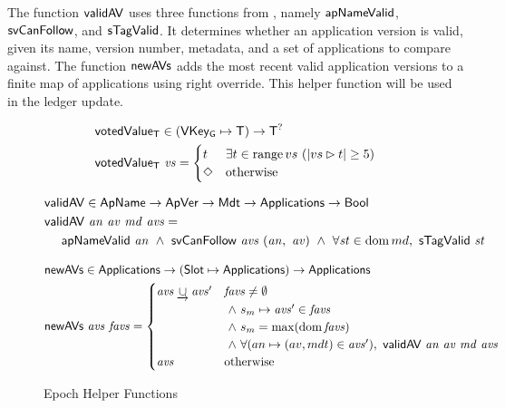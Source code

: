 The function $\mathsf{validAV}$ uses three functions from \cite{byron_ledger_spec}, namely
$\mathsf{apNameValid}$, $\mathsf{svCanFollow}$, and $\mathsf{sTagValid}$. It determines
whether an application version is valid, given its name, version number,
metadata, and a set of applications to compare against.
The function $\mathsf{newAVs}$ adds the most recent valid application
versions to a finite map of applications using right override.
This helper function will be used in the ledger update.

\begin{figure}[htb]
  \begin{align*}
      & \mathsf{votedValue_T} \in (\mathsf{VKey_G}\mapsto\mathsf{T}) \to \mathsf{T}^?\\
      & \mathsf{votedValue_T}~\mathit{vs} =
        \begin{cases}
          t & \exists t\in\operatorname{range}{vs}~(|vs\rhd t|\geq 5) \\
          \Diamond & \text{otherwise} \\
        \end{cases}
  \end{align*}

  \begin{align*}
      & \mathsf{validAV} \in \mathsf{ApName} \to \mathsf{ApVer} \to \mathsf{Mdt} \to \mathsf{Applications} \to \mathsf{Bool}\\
      & \mathsf{validAV}~\mathit{an}~\mathit{av}~\mathit{md}~\mathit{avs} = \\
      & ~~~~\mathsf{apNameValid}~\mathit{an}
        ~\land~\mathsf{svCanFollow}~\mathit{avs}~(\mathit{an},~\mathit{av})
        ~\land~\forall\mathit{st}\in\operatorname{dom}{md},~\mathsf{sTagValid}~\mathit{st}
  \end{align*}

  \begin{align*}
      & \mathsf{newAVs} \in \mathsf{Applications} \to (\mathsf{Slot}\mapsto\mathsf{Applications}) \to \mathsf{Applications} \\
      & \mathsf{newAVs}~\mathit{avs}~\mathit{favs} =
        \begin{cases}
          \mathit{avs}\mathbin{\underrightarrow\cup}\mathit{avs}'
                     & \mathit{favs}\neq\emptyset \\
                     & ~\land~s_m\mapsto\mathit{avs'}\in\mathit{favs} \\
                     & ~\land~s_m=\max(\operatorname{dom}{\mathit{favs}}) \\
                     & ~\land~\forall(an\mapsto(av, mdt)\in\mathit{avs}'),
                         ~\mathsf{validAV}~\mathit{an}~\mathit{av}~\mathit{md}~\mathit{avs}
          \\
          \mathit{avs} & \text{otherwise}
        \end{cases}
  \end{align*}

  \caption{Epoch Helper Functions}
  \label{fig:funcs:helper-updates}
\end{figure}

